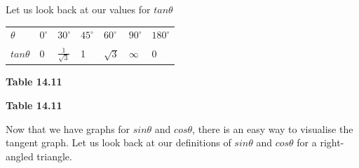         \label{m39414*id89576}Let us look back at our values for \begin{math}tan\theta \end{math}\par 
          \begin{table}[H]
        \begin{center}
      \label{m39414*id89593}
    \noindent
      \tablelasttail{}
      \begin{xtabular}[t]{|l|l|l|l|l|l|l|}\hline
                  $\theta $
                 &
                  ${0}^{\circ }$
                 &
                  ${30}^{\circ }$
                 &
                  ${45}^{\circ }$
                 &
                  ${60}^{\circ }$
                 &
                  ${90}^{\circ }$
                 &
                  ${180}^{\circ }$
     \tabularnewline{}
                  $tan\theta $
                 &
        0 &
                  $\frac{1}{\sqrt{3}}$
                 &
        1 &
                  $\sqrt{3}$
                 &
                  $\infty $
                 &
        0%
     \tabularnewline{}
    \end{xtabular}
      \end{center}
    \begin{center}{\small\bfseries Table 14.11}\end{center}
    \begin{caption}{\small\bfseries Table 14.11}\end{caption}
\end{table}
    \par
        \label{m39414*id89839}Now that we have graphs for $sin\theta $ and $cos\theta $, there is an easy way to visualise the tangent graph. Let us look back at our definitions of $sin\theta $ and $cos\theta $ for a right-angled triangle.\par 
        \label{m39414*id89902}\nopagebreak\noindent{}
          
